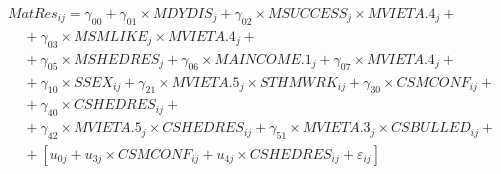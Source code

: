 \documentclass[12pt,a4paper]{article}
\begin{document}
\begin{small}
\begin{equation} \label{eq:timss3}
\begin{array}{l}
MatRes_{ij}=\gamma_{00}+\gamma_{01}\times MDYDIS_j+\gamma_{02}\times MSUCCESS_j\times MVIETA.4_j+\\
\ \ \ \ \ +\gamma_{03}\times MSMLIKE_j\times MVIETA.4_j+\\
\ \ \ \ \ +\gamma_{05}\times MSHEDRES_j+\gamma_{06}\times MAINCOME.1_j+\gamma_{07}\times MVIETA.4_j+\\
\ \ \ \ \ +\gamma_{10}\times SSEX_{ij}+\gamma_{21}\times MVIETA.5_j \times STHMWRK_{ij}+\gamma_{30}\times CSMCONF_{ij}+\\
\ \ \ \ \ +\gamma_{40}\times CSHEDRES_{ij}+\\
\ \ \ \ \ +\gamma_{42}\times MVIETA.5_j\times CSHEDRES_{ij}+\gamma_{51}\times MVIETA.3_j\times CSBULLED_{ij}+\\
\ \ \ \ \ +[u_{0j}+u_{3j}\times CSMCONF_{ij}+u_{4j}\times CSHEDRES_{ij}+\varepsilon_{ij}]
\end{array}
\end{equation}
\end{small}
\end{document}
